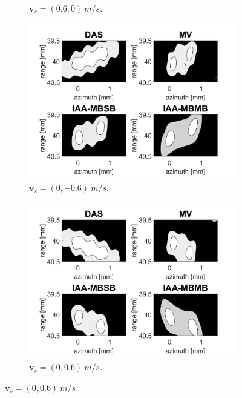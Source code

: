 \begin{figure}[ht]
\begin{subfigure}[t]{0.48\linewidth}
        \caption{$\boldsymbol{v}_s = (0.6, 0)~m/s$.}
        \label{fig:mla_b}
    \end{subfigure}
    \quad
    \begin{subfigure}[t]{0.48\linewidth}
        \includegraphics[width=\linewidth]{./images/results/4/motion_90_-06.png}
        \caption{$\boldsymbol{v}_s = (0, -0.6)~m/s$.}
        \label{fig:mla_c}
    \end{subfigure}
    \quad
    \begin{subfigure}[t]{0.48\linewidth}
        \includegraphics[width=\linewidth]{./images/results/4/motion_90_06.png}
        \caption{$\boldsymbol{v}_s = (0, 0.6)~m/s$.}
        \label{fig:mla_d}
    \end{subfigure}

\end{figure}
